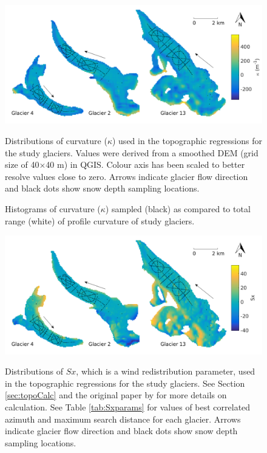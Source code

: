 \documentclass{sfuthesis}
\newcommand{\topomap}{Arrows indicate glacier flow direction and black dots show snow depth sampling locations. }
\begin{document}
\begin{figure}
	\centering
	\includegraphics[width=\textwidth]{Map_curvature.png}\\
	\caption{Distributions of curvature ($\kappa$) used in the topographic regressions for the study glaciers. Values were derived from a smoothed DEM (grid size of 40$\times$40 m) in QGIS. Colour axis has been scaled to better resolve values close to zero. \topomap}
	\label{map:curvature}
\end{figure}

\begin{figure}
	\caption{Histograms of curvature ($\kappa$) sampled (black) as compared to total range (white) of profile curvature of study glaciers.}
	\label{sampledRange:curvature}
\end{figure}

\begin{figure}
	\centering
	\includegraphics[width=\textwidth]{Map_Sx.png}\\
	\caption{Distributions of $Sx$, which is a wind redistribution parameter, used in the topographic regressions for the study glaciers. See Section \ref{sec:topoCalc} and the original paper by \cite{Winstral2002} for more details on calculation. See Table \ref{tab:Sxparams} for values of best correlated azimuth and maximum search distance for each glacier. \topomap }
	\label{map:Sx}
\end{figure}
\end{document}
